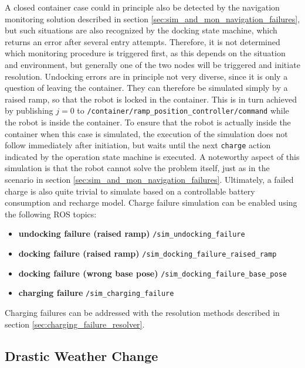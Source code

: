 \documentclass[english, master, utf8]{base/thesis_KBS}
\newcommand{\code}[1]{\colorbox{light-gray}{\texttt{#1}}}
\begin{document}
\noindent
A closed container case could in principle also be detected by the navigation monitoring solution described in section \ref{sec:sim_and_mon_navigation_failures}, but such situations
are also recognized by the docking state machine, which returns an error after several entry attempts. Therefore, it is not determined which monitoring procedure is triggered first,
as this depends on the situation and environment, but generally one of the two nodes will be triggered and initiate resolution. Undocking errors are in principle not very diverse,
since it is only a question of leaving the container. They can therefore be simulated simply by a raised ramp, so that the robot is locked in the container. This is in turn achieved
by publishing $j = 0$ to \code{/container/ramp\_position\_controller/command} while the robot is inside the container. To ensure that the robot is actually inside the container when
this case is simulated, the execution of the simulation does not follow immediately after initiation, but waits until the next \code{charge} action indicated by the operation
state machine is executed. A noteworthy aspect of this simulation is that the robot cannot solve the problem itself, just as in the  scenario in section
\ref{sec:sim_and_mon_navigation_failures}. Ultimately, a failed charge is also quite trivial to simulate based on a controllable battery consumption and recharge model.
Charge failure simulation can be enabled using the following ROS topics:
\begin{itemize}
    \item \textbf{undocking failure (raised ramp)} \textrightarrow \code{/sim\_undocking\_failure}
    \item \textbf{docking failure (raised ramp)} \textrightarrow \code{/sim\_docking\_failure\_raised\_ramp}
    \item \textbf{docking failure (wrong base pose)} \textrightarrow \code{/sim\_docking\_failure\_base\_pose}
    \item \textbf{charging failure} \textrightarrow \code{/sim\_charging\_failure}
\end{itemize}
Charging failures can be addressed with the resolution methods described in section \ref{sec:charging_failure_resolver}.

\subsection{Drastic Weather Change}
\label{sec:sim_and_mon_drastic_weather}
\end{document}
